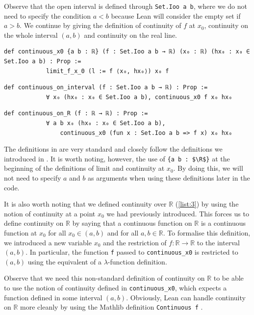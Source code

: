 \documentclass[a4paper,11pt]{article}
\theoremstyle{plain}
\newcommand{\R}{\ensuremath{\mathbb{R}}} %
\begin{document}
	Observe that the open interval is defined through \lstinline|Set.Ioo a b|, where we do not need to specify the condition $a<b$ because Lean will consider the empty set if $a>b$. We continue by giving the definition of continuity of $f$ at $x_0$, continuity on the whole interval $(a,b)$ and continuity on the real line.\\
	
	\begin{lstlisting}[caption={Definition of continuity at $x_0$.}, label={list:1}]
		def continuous_x0 {a b : ℝ} (f : Set.Ioo a b → ℝ) (x₀ : ℝ) (hx₀ : x₀ ∈ Set.Ioo a b) : Prop :=
			limit_f_x_0 (l := f ⟨x₀, hx₀⟩) x₀ f
	\end{lstlisting}
	
	\begin{lstlisting}[caption={Definition of continuity on $(a,b)$.}, label={list:2}]
		def continuous_on_interval (f : Set.Ioo a b → ℝ) : Prop :=
			∀ x₀ (hx₀ : x₀ ∈ Set.Ioo a b), continuous_x0 f x₀ hx₀
	\end{lstlisting}
	
	\begin{lstlisting}[caption={Definition of continuity on all $\R$.}, label={list:3}]
		def continuous_on_R (f : ℝ → ℝ) : Prop :=
			∀ a b x₀ (hx₀ : x₀ ∈ Set.Ioo a b),
				continuous_x0 (fun x : Set.Ioo a b => f x) x₀ hx₀
	\end{lstlisting}
	
	The definitions in  are very standard and closely follow the definitions we introduced in . It is worth noting, however, the use of \lstinline|{a b : $\R$}| at the beginning of the definitions of limit and continuity at $x_0$. By doing this, we will not need to specify $a$ and $b$ as arguments when using these definitions later in the code.
	
	It is also worth noting that we defined continuity over $\R$ (\cref{list:3}) by using the notion of continuity at a point $x_0$ we had previously introduced. This forces us to define continuity on $\R$ by saying that a continuous function on $\R$ is a continuous function at $x_0$ for all $x_0\in(a,b)$ and for all $a,b\in\R$. To formalise this definition, we introduced a new variable $x_0$ and the restriction of $f:\R\rightarrow\R$ to the interval $(a,b)$. In particular, the function \lstinline|f| passed to \lstinline|continuous_x0| is restricted to $(a,b)$ using the equivalent of a $\lambda$-function definition.
	
	Observe that we need this non-standard definition of continuity on $\R$ to be able to use the notion of continuity defined in \lstinline|continuous_x0|, which expects a function defined in some interval $(a,b)$. Obviously, Lean can handle continuity on $\R$ more cleanly by using the Mathlib definition \lstinline|Continuous f| \cite{LeanContinuity}.
	
\end{document}
